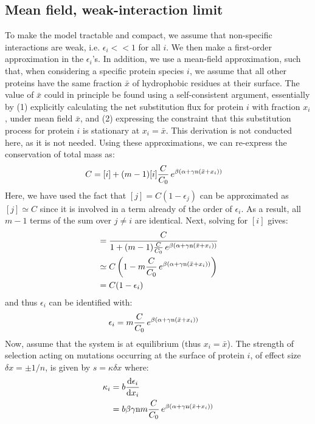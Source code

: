 \subsection{Mean field, weak-interaction limit}
To make the model tractable and compact, we assume that non-specific interactions are weak, i.e. $\epsilon_i << 1$ for all $i$. We then make a first-order approximation in the $\epsilon_i$'s.
In addition, we use a mean-field approximation, such that, when considering a specific protein species $i$, we assume that all other proteins have the same fraction $\bar x$ of hydrophobic residues at their surface.
The value of $\bar x$ could in principle be found using a self-consistent argument, essentially by (1) explicitly calculating the net substitution flux for protein $i$ with fraction $x_i$, under mean field $\bar x$, and (2) expressing the constraint that this substitution process for protein $i$ is stationary at $x_i = \bar x$.
This derivation is not conducted here, as it is not needed.
Using these approximations, we can re-express the conservation of total mass as:
\begin{align}
C & = [i] + (m-1) [i] \frac{C}{C_0} \, e^{\beta (\alpha + \gamma \text{n} (\bar x + x_i))}
\end{align}
Here, we have used the fact that $[j] = C(1 - \epsilon_j)$ can be approximated as $[j] \simeq C$ since it is involved in a term already of the order of $\epsilon_i$. As a result, all $m-1$ terms of the sum over $j\neq i$ are identical.
Next, solving for $[i]$ gives:
\begin{align}
[i] & = \frac{C} {1 + (m-1) \frac{C}{C_0} \, e^{\beta (\alpha + \gamma \Nsite (\bar x + x_i))}}
\\ & \simeq C \left( 1 - m \frac{C}{C_0} \, e^{\beta (\alpha + \gamma \Nsite (\bar x + x_i))} \right)
\\ & =
C (1 - \epsilon_i)
\end{align}
and thus $\epsilon_i$ can be identified with:
\begin{align}
\epsilon_i  & = m \frac{C}{C_0} \, e^{\beta (\alpha +\gamma \text{n} (\bar x + x_i))}
\end{align}
Now, assume that the system is at equilibrium (thus $x_i = \bar x$). The strength of selection acting on mutations occurring at the surface of protein $i$, of effect size $\delta x = \pm 1/n$, is given by $s = \kappa \delta x$ where:
\begin{align}
\kappa_i & = b \frac{\mathrm{d}\epsilon_i} {\mathrm{d} x_i} 
\\ & =
b \beta \gamma \text{n} m \frac{C}{C_0} \, e^{\beta (\alpha +\gamma \text{n} (\bar x + x_i))}
\end{align}
